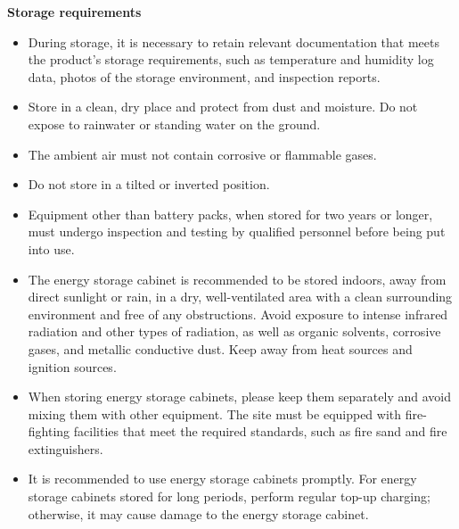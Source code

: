 \documentclass[11pt, a4paper]{article}
\begin{document}
\textbf{Storage requirements}
\begin{itemize}[leftmargin=1.5em]
    \item During storage, it is necessary to retain relevant documentation that meets the product's storage requirements, such as temperature and humidity log data, photos of the storage environment, and inspection reports.
    \item Store in a clean, dry place and protect from dust and moisture. Do not expose to rainwater or standing water on the ground.
    \item The ambient air must not contain corrosive or flammable gases.
    \item Do not store in a tilted or inverted position.
    \item Equipment other than battery packs, when stored for two years or longer, must undergo inspection and testing by qualified personnel before being put into use.
    \item The energy storage cabinet is recommended to be stored indoors, away from direct sunlight or rain, in a dry, well-ventilated area with a clean surrounding environment and free of any obstructions. Avoid exposure to intense infrared radiation and other types of radiation, as well as organic solvents, corrosive gases, and metallic conductive dust. Keep away from heat sources and ignition sources.
    \item When storing energy storage cabinets, please keep them separately and avoid mixing them with other equipment. The site must be equipped with fire-fighting facilities that meet the required standards, such as fire sand and fire extinguishers.
    \item It is recommended to use energy storage cabinets promptly. For energy storage cabinets stored for long periods, perform regular top-up charging; otherwise, it may cause damage to the energy storage cabinet.
\end{itemize}
\end{document}
